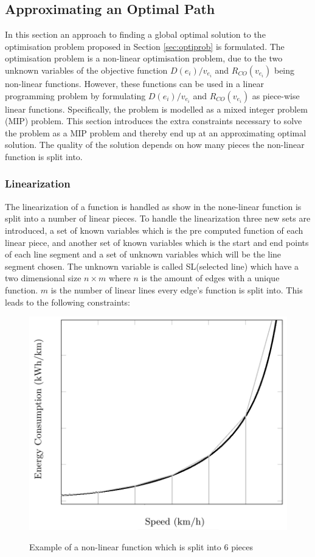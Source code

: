 
\subsection{Approximating an Optimal Path}\label{sec:LP}
In this section an approach to finding a global optimal solution to the optimisation problem proposed in Section \ref{sec:optiprob} is formulated. The optimisation problem is a non-linear optimisation problem, due to the two unknown variables of the objective function \( D(e_i)/v_{e_i} \) and $R_{CO}(v_{e_i})$ being non-linear functions. However, these functions can be used in a linear programming problem by formulating \( D(e_i)/v_{e_i} \) and $R_{CO}(v_{e_i})$ as piece-wise linear functions. Specifically, the problem is modelled as a mixed integer problem (MIP) problem. This section introduces the extra constraints necessary to solve the problem as a MIP problem and thereby end up at an approximating optimal solution. The quality of the solution depends on how many pieces the non-linear function is split into. 

\subsubsection{Linearization}
The linearization of a function is handled as show in  the none-linear function is split into a number of linear pieces. To handle the linearization three new sets are introduced, a set of known variables which is the pre computed function of each linear piece, and another set of known variables which is the start and end points of each line segment and a set of unknown variables which will be the line segment chosen. The unknown variable is called SL(selected line) which have a two dimensional size $n \times m$ where $n$ is the amount of edges with a unique function. $m$ is the number of linear lines every edge's function is split into. This leads to the following constraints:  

\begin{figure}[h!]
\centering
\includegraphics[scale=0.33]{images/linearization_example}
\label{fig:linearization_example}
\caption{Example of a non-linear function which is split into 6 pieces}
\end{figure}

